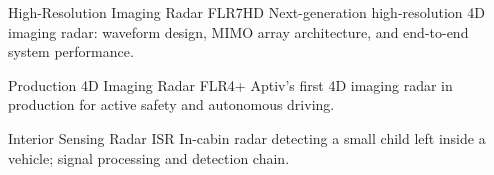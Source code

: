 %
%



\begin{cventries}

    \cventry
        {High-Resolution Imaging Radar}
        {FLR7HD}
        {}
        {}
        {{\cvdescfont Next-generation high-resolution 4D imaging radar: waveform design, MIMO array architecture, and end-to-end system performance.}}

    \cventry
        {Production 4D Imaging Radar}
        {FLR4+}
        {}
        {}
        {{\cvdescfont Aptiv's first 4D imaging radar in production for active safety and autonomous driving.}}

    \cventry
        {Interior Sensing Radar}
        {ISR}
        {}
        {}
        {{\cvdescfont In-cabin radar detecting a small child left inside a vehicle; signal processing and detection chain.}}

\end{cventries}




